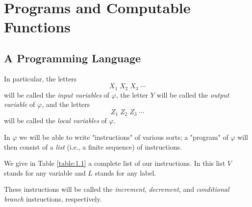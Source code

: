 \documentclass[a4paper,10pt,twoside]{book}
\begin{document}
\chapter{Programs and Computable Functions}
\section{A Programming Language}

In particular, the letters $$X_1\;X_2\;X_3\;\cdots$$ will be called the \textit{input variables} of $\varphi$, the letter $Y$ will be called the \textit{output variable} of $\varphi$, and the letters $$Z_1\;Z_2\;Z_3\;\cdots$$ will be called the \textit{local variables} of $\varphi$.

In $\varphi$ we will be able to write "instructions" of various sorts; a "program" of $\varphi$ will then consist of a \textit{list} (i.e., a finite sequence) of instructions.

\begin{table}[htbp]
    \caption{}
    \label{table:1.1}
\end{table}

We give in Table \ref{table:1.1} a complete list of our instructions. In this list $V$ stands for any variable and $L$ stands for any label.

These instructions will be called the \textit{increment}, \textit{decrement}, and \textit{conditional branch} instructions, respectively.
\end{document}
